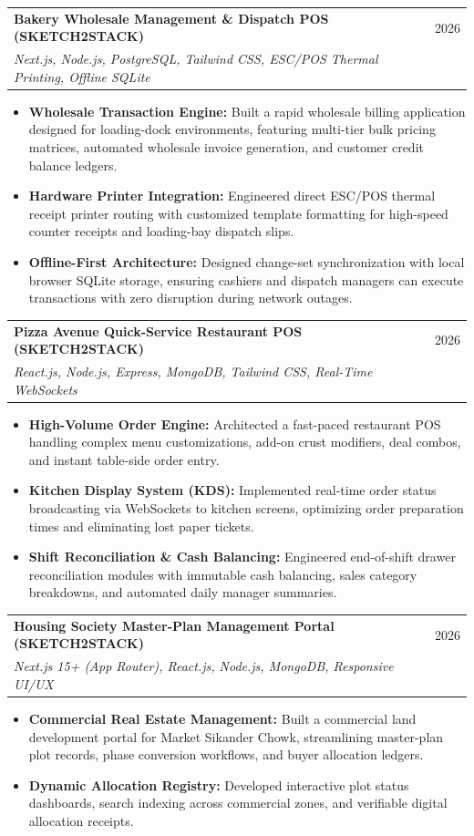 \documentclass[letterpaper,10pt]{article}
\makeatletter
\newcommand{\resumeItem}[1]{
  \item\small{
    {#1 \vspace{-1.5pt}}
  }
}
\newcommand{\resumeProjectHeading}[3]{
  \vspace{2.5pt}\item
    \begin{tabular*}{0.98\textwidth}[t]{l@{\extracolsep{\fill}}r}
      \textbf{#1} & \small #2 \\
      \textit{\small #3} & \\
    \end{tabular*}\vspace{-4pt}
}
\newcommand{\resumeItemListStart}{\begin{itemize}[leftmargin=0.15in]}
\newcommand{\resumeItemListEnd}{\end{itemize}\vspace{-3pt}}
\makeatother
\begin{document}
    \resumeProjectHeading
        {Bakery Wholesale Management \& Dispatch POS \normalfont(SKETCH2STACK)}{2026}
        {Next.js, Node.js, PostgreSQL, Tailwind CSS, ESC/POS Thermal Printing, Offline SQLite}
        \resumeItemListStart
          \resumeItem{\textbf{Wholesale Transaction Engine:} Built a rapid wholesale billing application designed for loading-dock environments, featuring multi-tier bulk pricing matrices, automated wholesale invoice generation, and customer credit balance ledgers.}
          \resumeItem{\textbf{Hardware Printer Integration:} Engineered direct ESC/POS thermal receipt printer routing with customized template formatting for high-speed counter receipts and loading-bay dispatch slips.}
          \resumeItem{\textbf{Offline-First Architecture:} Designed change-set synchronization with local browser SQLite storage, ensuring cashiers and dispatch managers can execute transactions with zero disruption during network outages.}
        \resumeItemListEnd

    \resumeProjectHeading
        {Pizza Avenue Quick-Service Restaurant POS \normalfont(SKETCH2STACK)}{2026}
        {React.js, Node.js, Express, MongoDB, Tailwind CSS, Real-Time WebSockets}
        \resumeItemListStart
          \resumeItem{\textbf{High-Volume Order Engine:} Architected a fast-paced restaurant POS handling complex menu customizations, add-on crust modifiers, deal combos, and instant table-side order entry.}
          \resumeItem{\textbf{Kitchen Display System (KDS):} Implemented real-time order status broadcasting via WebSockets to kitchen screens, optimizing order preparation times and eliminating lost paper tickets.}
          \resumeItem{\textbf{Shift Reconciliation \& Cash Balancing:} Engineered end-of-shift drawer reconciliation modules with immutable cash balancing, sales category breakdowns, and automated daily manager summaries.}
        \resumeItemListEnd

    \resumeProjectHeading
        {Housing Society Master-Plan Management Portal \normalfont(SKETCH2STACK)}{2026}
        {Next.js 15+ (App Router), React.js, Node.js, MongoDB, Responsive UI/UX}
        \resumeItemListStart
          \resumeItem{\textbf{Commercial Real Estate Management:} Built a commercial land development portal for Market Sikander Chowk, streamlining master-plan plot records, phase conversion workflows, and buyer allocation ledgers.}
          \resumeItem{\textbf{Dynamic Allocation Registry:} Developed interactive plot status dashboards, search indexing across commercial zones, and verifiable digital allocation receipts.}
        \resumeItemListEnd
\end{document}
